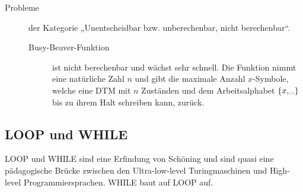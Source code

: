 \begin{description}
        \item[Probleme] der Kategorie „Unentscheidbar bzw. unberechenbar, nicht berechenbar“. 
            \begin{description}
                \item[Busy-Beaver-Funktion] ist nicht berechenbar und wächst sehr schnell. Die Funktion nimmt eine natürliche Zahl $n$ und gibt die maximale Anzahl $x$-Symbole, welche eine DTM mit $n$ Zuständen und dem Arbeitsalphabet $\{x,\blank\}$ bis zu ihrem Halt schreiben kann, zurück.
            \end{description}
    \end{description}

\subsection{LOOP und WHILE}
    LOOP und WHILE sind eine Erfindung von Schöning und sind quasi eine pädagogische Brücke zwischen den Ultra-low-level Turingmaschinen und High-level Programmiersprachen. WHILE baut auf LOOP auf. 
